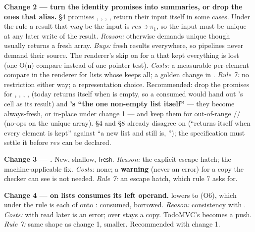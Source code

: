 \textbf{Change 2 — turn the identity promises into summaries, or drop the ones that alias.}  §4 promises , , , ,  return their input itself in some cases. Under the rule a result that \emph{may} be the input is $\mathit{res}\ni \pi _{1}$, so the input must be unique at any later write of the result. \emph{Reason:} otherwise  demands  unique though  usually returns a fresh array. \emph{Buys:} fresh results everywhere, so pipelines never demand their source. The renderer's skip on \code{===} for a  that kept everything is lost (one O(n) compare instead of one pointer test). \emph{Costs:} a measurable per-element compare in the renderer for lists whose  keeps all; a golden change in . \emph{Rule 7:} no restriction either way; a representation choice. Recommended: drop the promises for , , , , \textbf{} (today  returns  itself when  is empty, so a consumed  would hand out 's cell as its result) and \textbf{'s “the one non-empty list itself”} — they become always-fresh, or in-place under change 1 — and keep them for out-of-range // (no-ops on the unique array).  §4 and §8 already disagree on  (“returns  itself when every element is kept” against “a new list and still is, ”); the specification must settle it before $\mathit{res}$ can be declared.

\textbf{Change 3 — .} New, shallow, $\mathsf{fresh}$. \emph{Reason:} the explicit escape hatch; the machine-applicable fix. \emph{Costs:} none; a  \textbf{warning} (never an error) for a copy the checker can see is not needed. \emph{Rule 7:} an escape hatch, which rule 7 asks for.

\textbf{Change 4 — \code{++} on lists consumes its left operand.}  lowers to  (O6), which under the rule is  each of  onto :  consumed,  borrowed. \emph{Reason:} consistency with \code{[ …xs, …ys ]}. \emph{Costs:}  with  read later is an error;  over  stays a copy. TodoMVC's  becomes a push. \emph{Rule 7:} same shape as change 1, smaller. Recommended with change 1.


